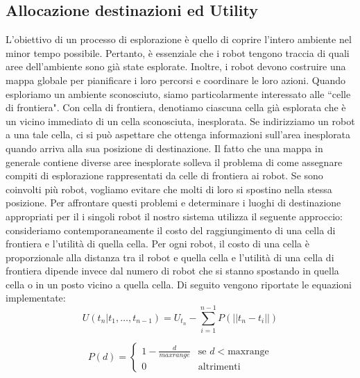 \subsection{Allocazione destinazioni ed Utility}
L'obiettivo di un processo di esplorazione è quello di coprire l'intero 
ambiente nel minor tempo possibile. Pertanto, è essenziale che i robot
tengono traccia di quali aree dell'ambiente sono già state esplorate. 
Inoltre, i robot devono costruire una mappa globale per pianificare i loro 
percorsi e coordinare le loro azioni.
%
Quando esploriamo un ambiente sconosciuto, siamo particolarmente 
interessato alle ``celle di frontiera". 
Con cella di frontiera, denotiamo ciascuna cella già esplorata che è un vicino
immediato di un cella sconosciuta, inesplorata. 
Se indirizziamo un robot a una tale cella, ci si può aspettare che ottenga 
informazioni sull'area inesplorata quando arriva alla sua posizione di 
destinazione.
Il fatto che una mappa in generale contiene diverse aree inesplorate solleva 
il problema di come assegnare compiti di esplorazione rappresentati da celle
di frontiera ai robot.
Se sono coinvolti più robot, vogliamo evitare che molti di loro si spostino 
nella stessa posizione. Per affrontare questi problemi e determinare i luoghi 
di destinazione appropriati per il i singoli robot il nostro sistema utilizza il 
seguente approccio: consideriamo contemporaneamente il costo del 
raggiungimento di una cella di frontiera e l'utilità di quella cella.
Per ogni robot, il costo di una cella è proporzionale alla distanza tra il robot 
e quella cella e l'utilità di una cella di frontiera dipende invece dal numero di
robot che si stanno spostando in quella cella o in un posto vicino a quella 
cella.
Di seguito vengono riportate le equazioni implementate:
\begin{equation}	
\label{eq:componet1}
U(t_n|t_1,\dots,t_{n-1} ) = U_{t_n} -  \sum_{i=1}^{n-1} P(||t_n - t_i ||)
\end{equation}

\begin{equation}	
\label{eq:componet2}
P(d) = \begin{cases} 
   1 - \frac{d}{maxrange}  	&  	\mbox{se } d < \text{maxrange} \\  
   0 									& 		\text{altrimenti}
   \end{cases}
\end{equation}

